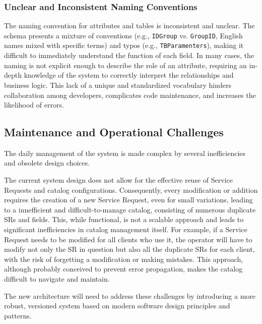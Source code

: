 \subsubsection{Unclear and Inconsistent Naming Conventions}
The naming convention for attributes and tables is inconsistent and unclear. The schema presents a mixture of conventions (e.g., \texttt{IDGroup} vs. \texttt{GroupID}, English names mixed with specific terms) and typos (e.g., \texttt{TBParamenters}), making it difficult to immediately understand the function of each field. In many cases, the naming is not explicit enough to describe the role of an attribute, requiring an in-depth knowledge of the system to correctly interpret the relationships and business logic. This lack of a unique and standardized vocabulary hinders collaboration among developers, complicates code maintenance, and increases the likelihood of errors.

\subsection{Maintenance and Operational Challenges}

The daily management of the system is made complex by several inefficiencies and obsolete design choices.

The current system design does not allow for the effective reuse of Service Requests and catalog configurations. Consequently, every modification or addition requires the creation of a new Service Request, even for small variations, leading to a innefficient and difficult-to-manage catalog, consisting of numerous duplicate SRs and fields. This, while functional, is not a scalable approach and leads to significant inefficiencies in catalog management itself. For example, if a Service Request needs to be modified for all clients who use it, the operator will have to modify not only the SR in question but also all the duplicate SRs for each client, with the risk of forgetting a modification or making mistakes. This approach, although probably conceived to prevent error propagation, makes the catalog difficult to navigate and maintain.

The new architecture will need to address these challenges by introducing a more robust, versioned system based on modern software design principles and patterns.